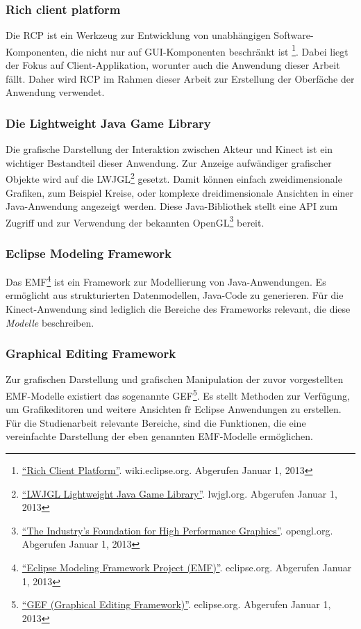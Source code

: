\subsubsection{Rich client platform}
Die \gls{RCP} ist ein Werkzeug zur Entwicklung von unabh\"angigen Software-Komponenten, die nicht nur auf \acrshort{GUI}-Komponenten beschr\"ankt ist
\footnote{\href{http://wiki.eclipse.org/index.php/Rich_Client_Platform}{\enquote{Rich Client Platform}}. wiki.eclipse.org. Abgerufen Januar 1, 2013}.
Dabei liegt der Fokus auf Client-Applikation, worunter auch die Anwendung dieser Arbeit f\"allt.
Daher wird \acrshort{RCP} im Rahmen dieser Arbeit zur Erstellung der Oberf\"ache der Anwendung verwendet.
\subsubsection{Die Lightweight Java Game Library}
Die grafische Darstellung der Interaktion zwischen Akteur und Kinect ist ein wichtiger Bestandteil dieser Anwendung.
Zur Anzeige aufw\"andiger grafischer Objekte wird auf die \gls{LWJGL}\footnote{\href{http://www.lwjgl.org/}{\enquote{LWJGL Lightweight Java Game Library}}. lwjgl.org. Abgerufen Januar 1, 2013} gesetzt.
Damit k\"onnen einfach zweidimensionale Grafiken, zum Beispiel Kreise, oder komplexe dreidimensionale Ansichten in einer Java-Anwendung angezeigt werden.
Diese Java-Bibliothek stellt eine API zum Zugriff und zur Verwendung der bekannten \gls{OpenGL}\footnote{\href{https://www.opengl.org/}{\enquote{The Industry's Foundation for High Performance Graphics}}. opengl.org. Abgerufen Januar 1, 2013} bereit.

\subsubsection{Eclipse Modeling Framework}
Das \gls{EMF}\footnote{\href{http://www.eclipse.org/modeling/emf/}{\enquote{Eclipse Modeling Framework Project (EMF)}}. eclipse.org. Abgerufen Januar 1, 2013} ist ein Framework zur Modellierung von Java-Anwendungen.
Es erm\"oglicht aus strukturierten Datenmodellen, Java-Code zu generieren. F\"ur die Kinect-Anwendung sind lediglich die Bereiche des Frameworks relevant, die diese \textit{Modelle} beschreiben.
 
\subsubsection{Graphical Editing Framework}
Zur grafischen Darstellung und grafischen Manipulation der zuvor vorgestellten EMF-Modelle existiert das sogenannte \gls{GEF}\footnote{\href{http://www.eclipse.org/gef/}{\enquote{GEF (Graphical Editing Framework)}}. eclipse.org. Abgerufen Januar 1, 2013}.
Es stellt Methoden zur Verf\"ugung, um Grafikeditoren und weitere Ansichten f\"r Eclipse Anwendungen zu erstellen. F\"ur die Studienarbeit relevante Bereiche, sind die Funktionen, die eine vereinfachte Darstellung der eben genannten EMF-Modelle erm\"oglichen.

